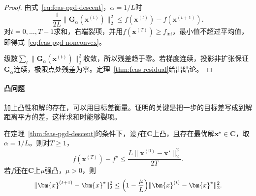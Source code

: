\begin{proof}
由式~\eqref{eq:feas-pgd-descent}，$\alpha=1/L$时
\[
 \frac{1}{2L}\lVert\bm{G}_\alpha(\bm{x}^{(t)})\rVert_2^2\leq f(\bm{x}^{(t)})-f(\bm{x}^{(t+1)}).
\]
对$t=0,\ldots,T-1$求和，右端裂项，并用$f(\bm{x}^{(T)})\geq f_{\inf}$，最小值不超过平均值，即得式~\eqref{eq:feas-pgd-nonconvex}。

级数$\sum_t\lVert\bm{G}_\alpha(\bm{x}^{(t)})\rVert_2^2$收敛，所以残差趋于零。若梯度连续，投影非扩张保证$\bm{G}_\alpha$连续，极限点处残差为零。定理~\ref{thm:feas-residual}给出结论。
\end{proof}

\paragraph{凸问题}
加上凸性和解的存在，可以用目标差衡量。证明的关键是把一步的目标差写成到解距离平方的差，这样求和时能够裂项。

\begin{theorem}[凸情形的投影梯度]
\label{thm:feas-pgd-convex}
在定理~\ref{thm:feas-pgd-descent}的条件下，设$f$在$\bm{C}$上凸，且存在最优解$\bm{x}^\star\in\bm{C}$，取$\alpha=1/L$。则对$T\geq1$，
\begin{equation}
 f(\bm{x}^{(T)})-f^\star\leq\frac{L\lVert\bm{x}^{(0)}-\bm{x}^\star\rVert_2^2}{2T}.
 \label{eq:feas-pgd-convex}
\end{equation}
若$f$还在$\bm{C}$上$\mu$强凸，$\mu>0$，则
\begin{equation}
 \lVert\bm{x}^{(t+1)}-\bm{x}^\star\rVert_2^2\leq\Bigl(1-\frac\mu L\Bigr)\lVert\bm{x}^{(t)}-\bm{x}^\star\rVert_2^2.
 \label{eq:feas-pgd-strong}
\end{equation}
\end{theorem}

